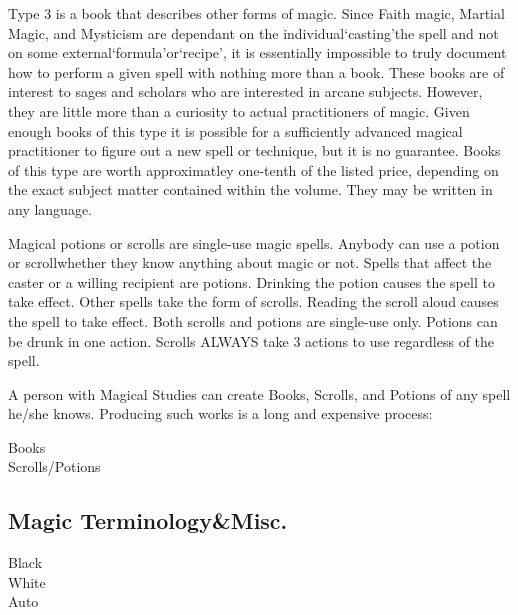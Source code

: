 \documentclass[twoside]{book}
\begin{document}
    {  
    Type 3 is a book that describes other forms of magic. Since Faith magic, Martial Magic, and Mysticism are dependant on the individual`casting'the spell and not on some external`formula'or`recipe', it is essentially impossible to truly document how to perform a given spell with nothing more than a book. These books are of interest to sages and scholars who are interested in arcane subjects. However, they are little more than a curiosity to actual practitioners of magic. Given enough books of this type it is possible for a sufficiently advanced magical practitioner to figure out a new spell or technique, but it is no guarantee. Books of this type are worth approximatley one-tenth of the listed price, depending on the exact subject matter contained within the volume. They may be written in any language.
    }
  
    {  
    Magical potions or scrolls are single-use magic spells. Anybody can use a potion or scrollwhether they know anything about magic or not. Spells that affect the caster or a willing recipient are potions. Drinking the potion causes the spell to take effect. Other spells take the form of scrolls. Reading the scroll aloud causes the spell to take effect. Both scrolls and potions are single-use only. Potions can be drunk in one action. Scrolls ALWAYS take 3 actions to use regardless of the spell.
    }
  
    {  
    A person with Magical Studies can create Books, Scrolls, and Potions of any spell he/she knows. Producing such works is a long and expensive process:
    }
  
\begin{description}
    
  \item[Books] 
  \item[Scrolls/Potions] 
\end{description}
  
    

\subsection{Magic Terminology\&Misc.}
    
\begin{description}
    
  \item[Black] 
  \item[White] 
  \item[Auto] 
\end{description}
  
\end{document}
